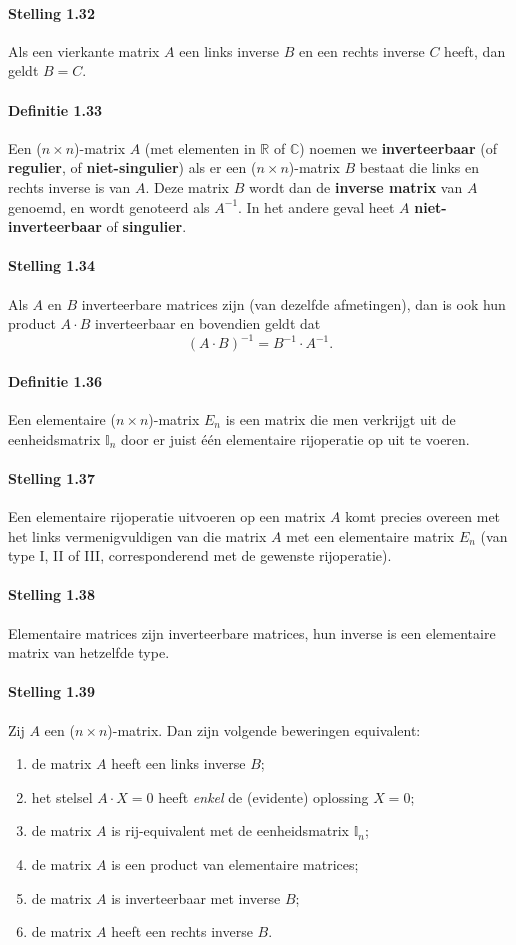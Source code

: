 \documentclass[11pt,oneside,a4paper]{article}
\begin{document}
	\paragraph{Stelling 1.32}
		Als een vierkante matrix $A$ een links inverse $B$ en een rechts inverse $C$ heeft, dan geldt $B=C$.
	\paragraph{Definitie 1.33}
		Een ($n\times n$)-matrix $A$ (met elementen in $\mathbb{R}$ of $\mathbb{C}$) noemen we \textbf{inverteerbaar} (of \textbf{regulier}, of \textbf{niet-singulier}) als er een ($n\times n$)-matrix $B$ bestaat die links en rechts inverse is van $A$. Deze matrix $B$ wordt dan de \textbf{inverse matrix} van $A$ genoemd, en wordt genoteerd als $A^{-1}$. In het andere geval heet $A$ \textbf{niet-inverteerbaar} of \textbf{singulier}.
	\paragraph{Stelling 1.34}
		Als $A$ en $B$ inverteerbare matrices zijn (van dezelfde afmetingen), dan is ook hun product $A \cdot B$ inverteerbaar en bovendien geldt dat $$(A \cdot B)^{-1}=B^{-1} \cdot A^{-1}.$$
	\paragraph{Definitie 1.36}
		Een elementaire ($n\times n$)-matrix $E_n$ is een matrix die men verkrijgt uit de eenheidsmatrix $\mathbb{I}_n$ door er juist één elementaire rijoperatie op uit te voeren.
	\paragraph{Stelling 1.37}
		Een elementaire rijoperatie uitvoeren op een matrix $A$ komt precies overeen met het links vermenigvuldigen van die matrix $A$ met een elementaire matrix $E_n$ (van type I, II of III, corresponderend met de gewenste rijoperatie).
	\paragraph{Stelling 1.38}
		Elementaire matrices zijn inverteerbare matrices, hun inverse is een elementaire matrix van hetzelfde type.
	\paragraph{Stelling 1.39}
		Zij $A$ een ($n \times n$)-matrix. Dan zijn volgende beweringen equivalent:
		\begin{enumerate}
			\item de matrix $A$ heeft een links inverse $B$;
			\item het stelsel $A \cdot X=0$ heeft \textit{enkel} de (evidente) oplossing $X = 0$;
			\item de matrix $A$ is rij-equivalent met de eenheidsmatrix $\mathbb{I}_n$;
			\item de matrix $A$ is een product van elementaire matrices;
			\item de matrix $A$ is inverteerbaar met inverse $B$;
			\item de matrix $A$ heeft een rechts inverse $B$.
		\end{enumerate}
\end{document}
